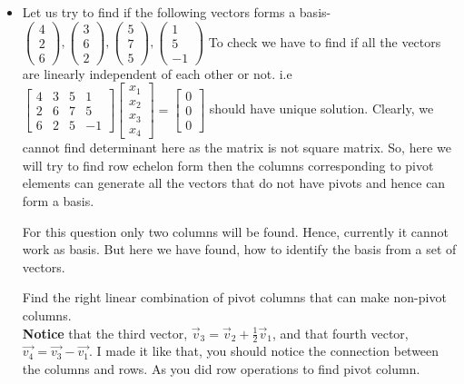 \documentclass{article}
\begin{document}
\begin{itemize}
\item Let us try to find if the following vectors forms a basis-\\
\(\begin{pmatrix}
4\\2\\6
\end{pmatrix},
\begin{pmatrix}
3\\6\\2
\end{pmatrix},\begin{pmatrix}
5\\7\\5
\end{pmatrix},\begin{pmatrix}
1\\5\\-1
\end{pmatrix}\)
To check we have to find if all the vectors are linearly independent of each other or not. i.e\\
\(\begin{bmatrix}
4 & 3 & 5 & 1\\
2 & 6 & 7 & 5\\
6 & 2 & 5 & -1
\end{bmatrix}
\begin{bmatrix}
x_1\\
x_2\\
x_3\\
x_4
\end{bmatrix}=
\begin{bmatrix}
0\\
0\\
0
\end{bmatrix}\)
should have unique solution. Clearly, we cannot find determinant here as the matrix is not square matrix. So, here we will try to find row echelon form then the columns corresponding to pivot elements can generate all the vectors that do not have pivots and hence can form a basis.\par

For this question only two columns will be found. Hence, currently it cannot work as basis. But here we have found, how to identify the basis from a set of vectors.
 
Find the right linear combination of pivot columns that can make non-pivot columns.\\
 
 \textbf{Notice} that the third vector, $\Vec{v}_3=\Vec{v}_2+\frac{1}{2}\Vec{v}_1$, and that fourth vector, $\Vec{v_4}=\Vec{v_3}-\Vec{v_1}$. I made it like that, you should notice the connection between the columns and rows. As you did row operations to find pivot column.\\
 

\end{itemize}
\end{document}
